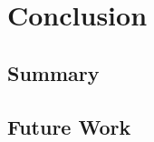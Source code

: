 \chapter{Conclusion}
\label{ch:conclusion}

\section{Summary}
\todo{}

\section{Future Work}
\todo{}

